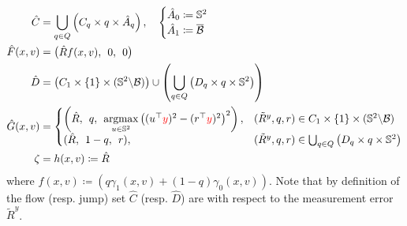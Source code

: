 \documentclass{article}
\newcommand{\brackets}[1]{\left(#1\right)}
\newcommand{\textblue}[1]{\textcolor{blue}{#1}}
\newcommand{\Rtilde}{\tilde{R}}
\begin{document}
\begin{subequations}\label{eq:hybrid_PCF}
\begin{align}
    \hat{C} &= \bigcup_{q\in Q}\brackets{{C}_{q}\times q \times \hat{A}_q}, \quad \begin{cases}
        \hat{A}_0 \coloneqq \mathbb{S}^2\\
        \hat{A}_1 \coloneqq \overline{\mathcal{B}}
    \end{cases}\\
    \hat{F}(x, v) &= \begin{pmatrix}
        \hat{R}f(x,v), \:\: 0, \:\: 0
    \end{pmatrix}\label{eq:13b}\\
    \hat{D} &= {\brackets{C_1\times\{1\}\times (\mathbb{S}^2\backslash \mathcal{B})} \cup \brackets{\bigcup_{q\in Q} \brackets{{D}_{q}\times q\times \mathbb{S}^2}}}\\
    \hat{G}(x, v) &= \left\{\begin{array}{@{}ll@{}}
        \brackets{\hat{R}, \:\: q,\:\: \underset{u\in\mathbb{S}^2}{\mathrm{argmax}}\left((u^\top \textcolor{red}{y})^2 - (r^\top \textcolor{red}{y})^2\right)^2}, &(\Rtilde^y, q, r)\in C_1\times \{1\}\times (\mathbb{S}^2\backslash \mathcal{B})\\
            (\hat{R}, \:\: 1-q,\:\: r),
        &(\Rtilde^y, q, r)\in \bigcup_{q\in Q} \brackets{{D}_{q}\times q\times \mathbb{S}^2}
    \end{array}\right.\\
    \zeta &= h(x,v)\coloneqq \hat{R} \label{eq:output_hybrid}
\end{align}
\end{subequations}
where $f(x,v)\coloneqq \left(q\gamma_1(x,v) + (1-q)\gamma_0(x,v)\right)$. Note that by definition of the flow (resp. jump) set $\hat{C}$ (resp. $\hat{D}$) are with respect to the measurement error $\Rtilde^y$. 

\end{document}
